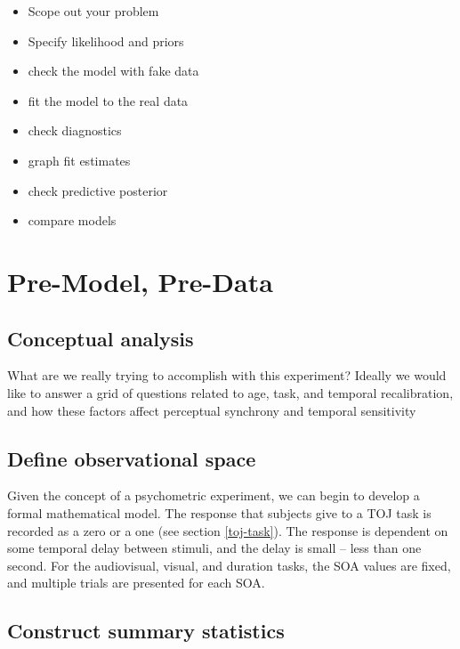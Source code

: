\documentclass[11pt, oneside]{book}
\providecommand{\tightlist}{%
  \setlength{\itemsep}{0pt}\setlength{\parskip}{0pt}}
\begin{document}
\begin{itemize}
\tightlist
\item
  Scope out your problem
\item
  Specify likelihood and priors
\item
  check the model with fake data
\item
  fit the model to the real data
\item
  check diagnostics
\item
  graph fit estimates
\item
  check predictive posterior
\item
  compare models
\end{itemize}

\hypertarget{pre-model-pre-data}{%
\section{Pre-Model, Pre-Data}\label{pre-model-pre-data}}

\hypertarget{conceptual-analysis}{%
\subsection{Conceptual analysis}\label{conceptual-analysis}}

What are we really trying to accomplish with this experiment? Ideally we would like to answer a grid of questions related to age, task, and temporal recalibration, and how these factors affect perceptual synchrony and temporal sensitivity

\hypertarget{define-observational-space}{%
\subsection{Define observational space}\label{define-observational-space}}

Given the concept of a psychometric experiment, we can begin to develop a formal mathematical model. The response that subjects give to a TOJ task is recorded as a zero or a one (see section \ref{toj-task}). The response is dependent on some temporal delay between stimuli, and the delay is small -- less than one second. For the audiovisual, visual, and duration tasks, the SOA values are fixed, and multiple trials are presented for each SOA.

\hypertarget{construct-summary-statistics}{%
\subsection{Construct summary statistics}\label{construct-summary-statistics}}
\end{document}
